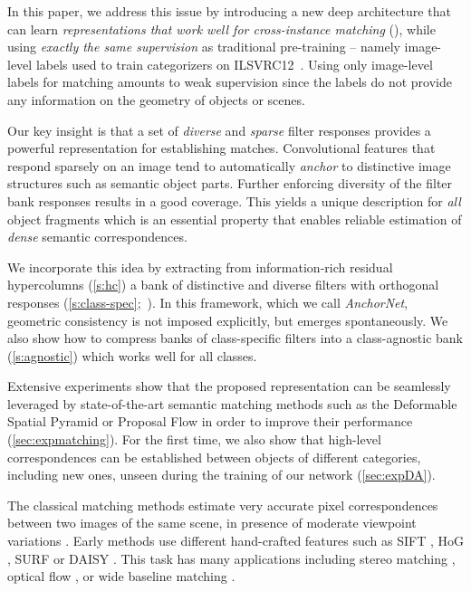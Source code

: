 \documentclass[10pt,twocolumn,letterpaper]{article}
\newcommand{\myparagraph}[1]{\vspace{0.15cm}\noindent\textbf{#1.}}
\begin{document}
In this paper, we address this issue by introducing a new deep architecture %
that can learn \textit{representations that work well for cross-instance matching} (), while using \textit{exactly the same supervision} as traditional pre-training -- namely image-level labels used to train categorizers on ILSVRC12~\cite{deng09imagenet}. Using only image-level labels for matching amounts to weak supervision since the labels do not provide any information on the geometry of objects or scenes. 

Our key insight is that a set of \emph{diverse} and \emph{sparse} filter responses provides a powerful representation
for establishing matches. Convolutional features that respond sparsely on an image tend to automatically \emph{anchor} to distinctive image structures such as semantic object parts. Further enforcing diversity of the filter bank responses results in a good coverage. This yields a unique
description for \emph{all} object fragments which is an essential property that enables reliable estimation of \emph{dense} semantic correspondences.

We incorporate this idea by extracting from information-rich residual hypercolumns (\cref{s:hc}) a bank of distinctive and diverse filters with orthogonal responses (\cref{s:class-spec};~). In this framework, which we call \emph{AnchorNet}, geometric consistency is not imposed explicitly, but emerges spontaneously. We also show how to compress banks of class-specific filters into a class-agnostic bank (\cref{s:agnostic}) which works well for all classes. %

Extensive experiments show that the proposed representation can be seamlessly leveraged by state-of-the-art semantic matching methods such as the Deformable Spatial Pyramid \cite{kim2013deformable} or Proposal Flow \cite{ham2016} in order to improve their performance (\cref{sec:expmatching}). For the first time, we also show that high-level correspondences can be established between objects of different categories, including new ones, unseen during the training of our network (\cref{sec:expDA}).

The classical matching methods estimate very accurate pixel correspondences between two images of the same scene, in presence of moderate viewpoint variations \cite{horn93determining, matas02robust, okutomi1993}. Early methods use different hand-crafted features such as SIFT \cite{lowe2004sift}, HoG \cite{dalal05hog}, SURF \cite{bay2008surf} or DAISY \cite{Tola10daisy}. This task has many applications including stereo matching \cite{okutomi1993}, optical flow \cite{horn93determining,weinzaepfel13deepflow}, or wide baseline matching \cite{matas02robust,yang2014daisyfilterflow}.
\end{document}
